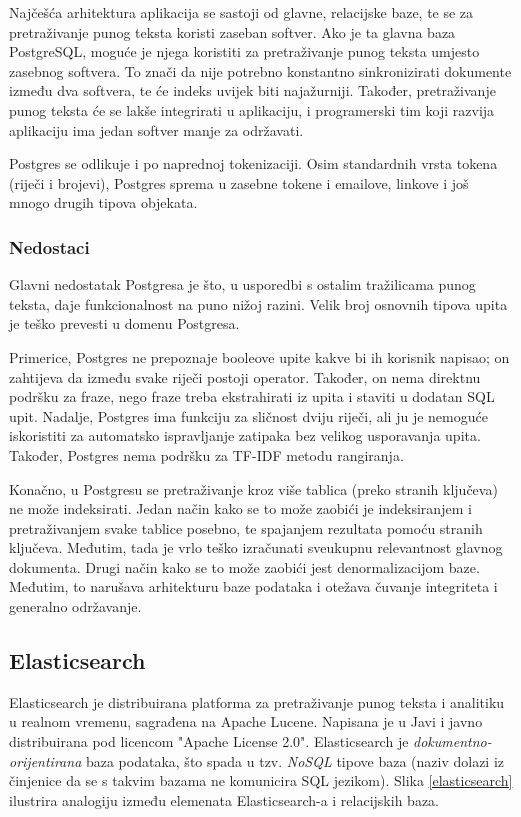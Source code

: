 \documentclass[a4paper,twoside,12pt]{scrreprt}
\begin{document}
Najčešća arhitektura aplikacija se sastoji od glavne, relacijske baze, te se za pretraživanje punog teksta koristi zaseban softver. Ako je ta glavna baza PostgreSQL, moguće je njega koristiti za pretraživanje punog teksta umjesto zasebnog softvera. To znači da nije potrebno konstantno sinkronizirati dokumente između dva softvera, te će indeks uvijek biti najažurniji. Također, pretraživanje punog teksta će se lakše integrirati u aplikaciju, i programerski tim koji razvija aplikaciju ima jedan softver manje za održavati.

Postgres se odlikuje i po naprednoj tokenizaciji. Osim standardnih vrsta tokena (riječi i brojevi), Postgres sprema u zasebne tokene i emailove, linkove i još mnogo drugih tipova objekata.

\subsubsection{Nedostaci}

Glavni nedostatak Postgresa je što, u usporedbi s ostalim tražilicama punog teksta, daje funkcionalnost na puno nižoj razini. Velik broj osnovnih tipova upita je teško prevesti u domenu Postgresa.

Primerice, Postgres ne prepoznaje booleove upite kakve bi ih korisnik napisao; on zahtijeva da između svake riječi postoji operator. Također, on nema direktnu podršku za fraze, nego fraze treba ekstrahirati iz upita i staviti u dodatan SQL upit. Nadalje, Postgres ima funkciju za sličnost dviju riječi, ali ju je nemoguće iskoristiti za automatsko ispravljanje zatipaka bez velikog usporavanja upita. Također, Postgres nema podršku za TF-IDF metodu rangiranja.

Konačno, u Postgresu se pretraživanje kroz više tablica (preko stranih ključeva) ne može indeksirati. Jedan način kako se to može zaobići je indeksiranjem i pretraživanjem svake tablice posebno, te spajanjem rezultata pomoću stranih ključeva. Međutim, tada je vrlo teško izračunati sveukupnu relevantnost glavnog dokumenta. Drugi način kako se to može zaobići jest denormalizacijom baze. Međutim, to narušava arhitekturu baze podataka i otežava čuvanje integriteta i generalno održavanje.

\subsection{Elasticsearch}

Elasticsearch je distribuirana platforma za pretraživanje punog teksta i analitiku u realnom vremenu, sagrađena na Apache Lucene. Napisana je u Javi i javno distribuirana pod licencom "Apache License 2.0". Elasticsearch je \textit{dokumentno-orijentirana} baza podataka, što spada u tzv. \textit{NoSQL} tipove baza (naziv dolazi iz činjenice da se s takvim bazama ne komunicira SQL jezikom). Slika \ref{elasticsearch} ilustrira analogiju između elemenata Elasticsearch-a i relacijskih baza.
\end{document}
